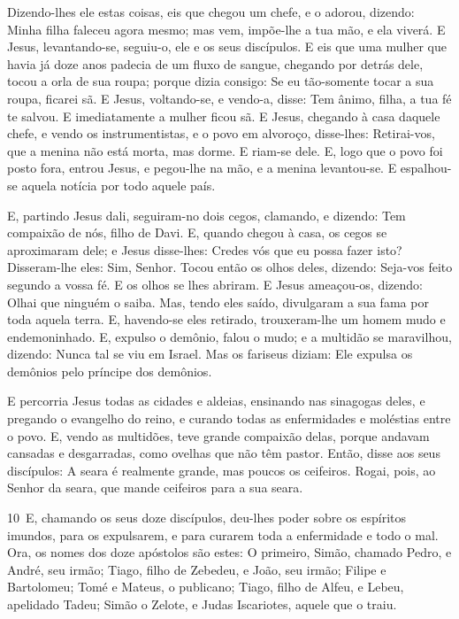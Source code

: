 Dizendo-lhes ele estas coisas, eis que chegou um chefe, e o
adorou, dizendo: Minha filha faleceu agora mesmo; mas vem, impõe-lhe
a tua mão, e ela viverá. E Jesus, levantando-se, seguiu-o,
ele e os seus discípulos. E eis que uma mulher que havia já
doze anos padecia de um fluxo de sangue, chegando por detrás dele,
tocou a orla de sua roupa; porque dizia consigo: Se eu
tão-somente tocar a sua roupa, ficarei sã. E Jesus,
voltando-se, e vendo-a, disse: Tem ânimo, filha, a tua fé te salvou.
E imediatamente a mulher ficou sã. E Jesus, chegando à casa
daquele chefe, e vendo os instrumentistas, e o povo em alvoroço,
disse-lhes: Retirai-vos, que a menina não está morta, mas
dorme. E riam-se dele. E, logo que o povo foi posto fora,
entrou Jesus, e pegou-lhe na mão, e a menina levantou-se. E
espalhou-se aquela notícia por todo aquele país.

E, partindo Jesus dali, seguiram-no dois cegos, clamando, e
dizendo: Tem compaixão de nós, filho de Davi. E, quando
chegou à casa, os cegos se aproximaram dele; e Jesus disse-lhes:
Credes vós que eu possa fazer isto? Disseram-lhe eles: Sim, Senhor.
Tocou então os olhos deles, dizendo: Seja-vos feito segundo a
vossa fé. E os olhos se lhes abriram. E Jesus ameaçou-os,
dizendo: Olhai que ninguém o saiba. Mas, tendo eles saído,
divulgaram a sua fama por toda aquela terra. E, havendo-se
eles retirado, trouxeram-lhe um homem mudo e endemoninhado.
E, expulso o demônio, falou o mudo; e a multidão se
maravilhou, dizendo: Nunca tal se viu em Israel. Mas os
fariseus diziam: Ele expulsa os demônios pelo príncipe dos demônios.

E percorria Jesus todas as cidades e aldeias, ensinando nas
sinagogas deles, e pregando o evangelho do reino, e curando todas as
enfermidades e moléstias entre o povo. E, vendo as multidões,
teve grande compaixão delas, porque andavam cansadas e desgarradas,
como ovelhas que não têm pastor. Então, disse aos seus
discípulos: A seara é realmente grande, mas poucos os ceifeiros.
Rogai, pois, ao Senhor da seara, que mande ceifeiros para a
sua seara.

\medskip

\lettrine{10}\ E, chamando os seus doze discípulos, deu-lhes
poder sobre os espíritos imundos, para os expulsarem, e para curarem
toda a enfermidade e todo o mal. Ora, os nomes dos doze
apóstolos são estes: O primeiro, Simão, chamado Pedro, e André, seu
irmão; Tiago, filho de Zebedeu, e João, seu irmão; Filipe e
Bartolomeu; Tomé e Mateus, o publicano; Tiago, filho de Alfeu, e
Lebeu, apelidado Tadeu; Simão o Zelote, e Judas Iscariotes,
aquele que o traiu.

